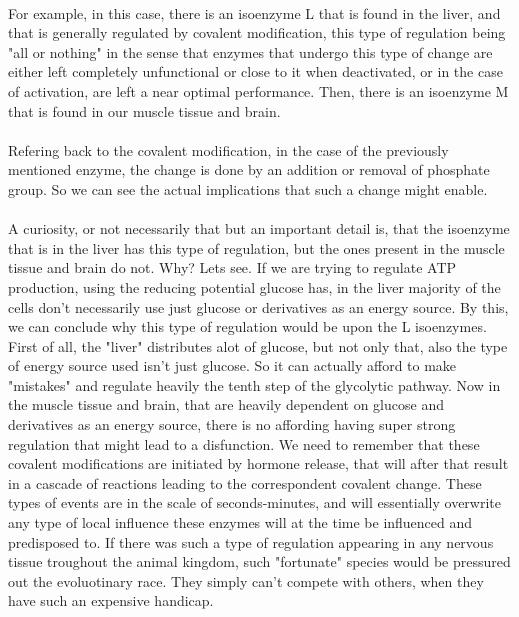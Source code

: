 \documentclass[12pt,  letterpaper]{article}
\begin{document}
\paragraph*{}
For example, in this case, there is an isoenzyme L that is found in the liver, and that is generally regulated by covalent modification, this type of regulation being "all or nothing" in the sense that enzymes that undergo this type of change are either left completely unfunctional or close to it when deactivated, or in the case of activation, are left a near optimal performance. Then, there is an isoenzyme M that is found in our muscle tissue and brain.\paragraph*{}
Refering back to the covalent modification, in the case of the previously mentioned enzyme, the change is done by an addition or removal of phosphate group. So we can see the actual implications that such a change might enable. 
\paragraph*{}
A curiosity, or not necessarily that but an important detail is, that the isoenzyme that is in the liver has this type of regulation, but the ones present in the muscle tissue and brain do not. Why? Lets see. If we are trying to regulate ATP production, using the reducing potential glucose has, in the liver majority of the cells don't necessarily use just glucose or derivatives as an energy source. By this, we can conclude why this type of regulation would be upon the L isoenzymes. First of all, the "liver" distributes alot of glucose, but not only that, also the type of energy source used isn't just glucose. So it can actually afford to make "mistakes" and regulate heavily the tenth step of the glycolytic pathway. Now in the muscle tissue and brain, that are heavily dependent on glucose and derivatives as an energy source, there is no affording having super strong regulation that might lead to a disfunction. We need to remember that these covalent modifications are initiated by hormone release, that will after that result in a cascade of reactions leading to the correspondent covalent change. These types of events are in the scale of seconds-minutes, and will essentially overwrite any type of local influence these enzymes will at the time be influenced and predisposed to. If there was such a type of regulation appearing in any nervous tissue troughout the animal kingdom, such "fortunate" species would be pressured out the evoluotinary race. They simply can't compete with others, when they have such an expensive handicap.
\end{document}
